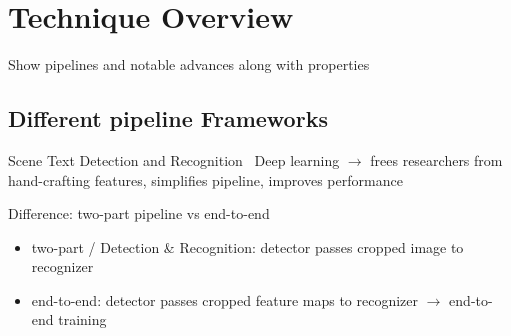 \chapter{Technique Overview}\label{ch:research}

Show pipelines and notable advances along with properties

\section{Different pipeline Frameworks}

Scene Text Detection and Recognition~\cite{long_scene_2021}
Deep learning $\rightarrow$ frees researchers from hand-crafting features, simplifies pipeline,
    improves performance

Difference: two-part pipeline vs end-to-end
\begin{itemize}
    \item two-part / Detection \& Recognition: detector passes cropped image to recognizer
    \item end-to-end: detector passes cropped feature maps to recognizer $\rightarrow$ end-to-end
            training
\end{itemize}


